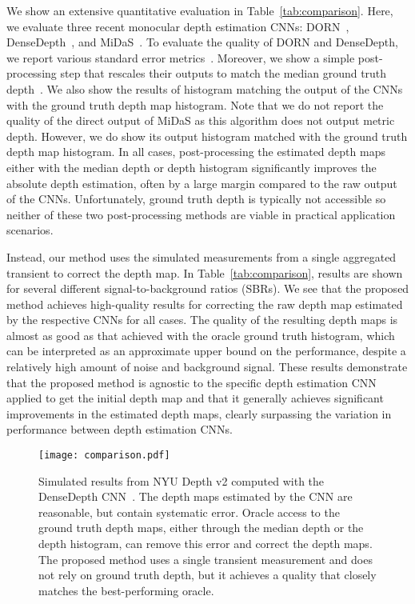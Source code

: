 We show an extensive quantitative evaluation in Table~\ref{tab:comparison}.
Here, we evaluate three recent monocular depth estimation CNNs:
DORN~\cite{Fu2018}, DenseDepth~\cite{Alhashim2018}, and
MiDaS~\cite{Lasinger:2019}. To evaluate the quality of DORN and DenseDepth, we
report various standard error metrics~\cite{Eigen2014}. Moreover, we show a
simple post-processing step that rescales their outputs to match the median
ground truth depth~\cite{Alhashim2018}. We also show the results of histogram
matching the output of the CNNs with the ground truth depth map histogram. Note
that we do not report the quality of the direct output of MiDaS as this
algorithm does not output metric depth. However, we do show its output histogram
matched with the ground truth depth map histogram. In all cases, post-processing
the estimated depth maps either with the median depth or depth histogram
significantly improves the absolute depth estimation, often by a large margin
compared to the raw output of the CNNs. Unfortunately, ground truth depth is
typically not accessible so neither of these two post-processing methods are
viable in practical application scenarios.


Instead, our method uses the simulated measurements from a single aggregated
transient to correct the depth map. In Table~\ref{tab:comparison}, results are
shown for several different signal-to-background ratios (SBRs). We see that the
proposed method achieves high-quality results for correcting the raw depth map
estimated by the respective CNNs for all cases. The quality of the resulting
depth maps is almost as good as that achieved with the oracle ground truth
histogram, which can be interpreted as an approximate upper bound on the
performance, despite a relatively high amount of noise and background signal.
These results demonstrate that the proposed method is agnostic to the specific
depth estimation CNN applied to get the initial depth map and that it generally
achieves significant improvements in the estimated depth maps, clearly
surpassing the variation in performance between depth estimation CNNs.

\begin{figure*}[t]
  \texttt{[image: comparison.pdf]}
  \caption{Simulated results from NYU Depth v2 computed with the DenseDepth
    CNN~\cite{Alhashim2018}. The depth maps estimated by the CNN are reasonable,
    but contain systematic error. Oracle access to the ground truth depth maps,
    either through the median depth or the depth histogram, can remove this
    error and correct the depth maps. The proposed method uses a single
    transient measurement and does not rely on ground truth depth, but it
    achieves a quality that closely matches the best-performing oracle.}
	\label{fig:results_simulated}
\end{figure*}


